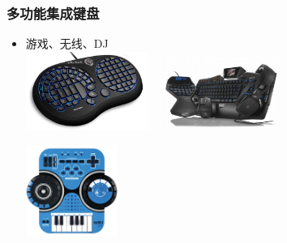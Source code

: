 \documentclass{beamer}
\begin{document}
\begin{frame}
	\frametitle{多功能集成键盘}
	\transdissolve
	\begin{itemize}
		\item 游戏、无线、DJ\\
		\includegraphics[width=4cm]{images/wolfking-warrior-xxtreme.jpg}~
		\includegraphics[width=4cm]{images/logitech-g19-gaming-keyboard.jpg}\\
		\begin{center}
		\includegraphics[width=3cm]{images/sound-x-electronic-keyboard-dj-mixer.jpg}
		\end{center}
	\end{itemize}
\end{frame}
\end{document}
